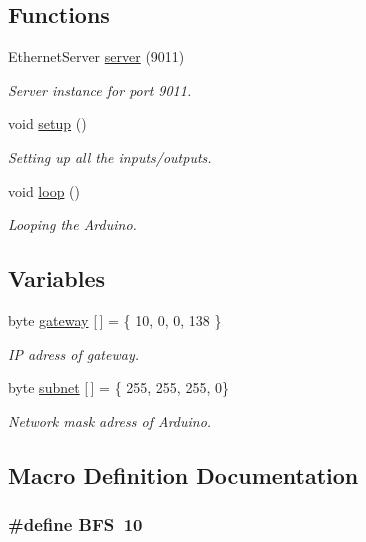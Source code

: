 \subsection*{Functions}
\begin{DoxyCompactItemize}
\item 
Ethernet\+Server \hyperlink{_aqa_server_8ino_a0d0f1af61ef5b9c8c9ac1ab61f99dd04}{server} (9011)
\begin{DoxyCompactList}\small\item\em Server instance for port 9011. \end{DoxyCompactList}\item 
void \hyperlink{_aqa_server_8ino_a1d04139db3a5ad5713ecbd14d97da879}{setup} ()
\begin{DoxyCompactList}\small\item\em Setting up all the inputs/outputs. \end{DoxyCompactList}\item 
void \hyperlink{_aqa_server_8ino_a11debc633c690ca19cb27df5f971d73d}{loop} ()
\begin{DoxyCompactList}\small\item\em Looping the Arduino. \end{DoxyCompactList}\end{DoxyCompactItemize}
\subsection*{Variables}
\begin{DoxyCompactItemize}
\item 
byte \hyperlink{_aqa_server_8ino_a50d8813b28b1fc9d3695b4c352fc1f73}{gateway} \mbox{[}$\,$\mbox{]} = \{ 10, 0, 0, 138 \}
\begin{DoxyCompactList}\small\item\em I\+P adress of gateway. \end{DoxyCompactList}\item 
byte \hyperlink{_aqa_server_8ino_a5785acd9d4432010fb73dc54d352ccc3}{subnet} \mbox{[}$\,$\mbox{]} = \{ 255, 255, 255, 0\}
\begin{DoxyCompactList}\small\item\em Network mask adress of Arduino. \end{DoxyCompactList}\end{DoxyCompactItemize}


\subsection{Macro Definition Documentation}
\hypertarget{_aqa_server_8ino_a1b83ef6dcb797171631472c31018beef}{
\subsubsection[{B\+F\+S}]{\setlength{\rightskip}{0pt plus 5cm}\#define B\+F\+S~10}}\label{_aqa_server_8ino_a1b83ef6dcb797171631472c31018beef}


